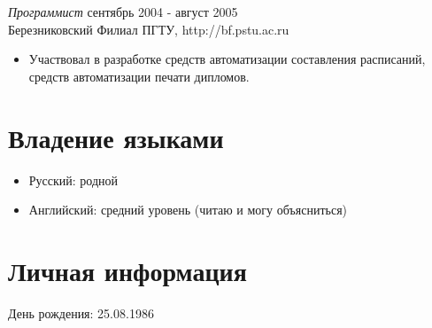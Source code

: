 \documentclass[13pt]{res} %
\begin{document}
\begin{resume}
{\sl Программист} \hfill сентябрь 2004 - август 2005 \\
Березниковский Филиал ПГТУ, http://bf.pstu.ac.ru
\begin{itemize}
\item Участвовал в разработке средств автоматизации составления расписаний, средств автоматизации печати дипломов.
\end{itemize} 

\section{Владение языками}
\begin{itemize}
\item Русский: родной
\item Английский: средний уровень (читаю и могу объясниться)
\end{itemize}

\section{Личная информация}
День рождения: 25.08.1986

\end{resume}
\end{document}
